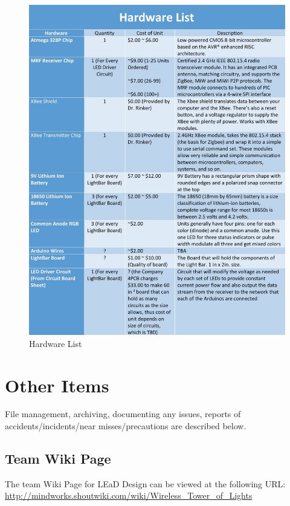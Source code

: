 \documentclass[12pt]{article}
\begin{document}
{{{{			\begin{figure}[ht!]
				\centering
				\includegraphics[width=170mm]{assets/HardwareList.jpg}
				\caption{Hardware List \label{overflow}}
			\end{figure}
			
			\newpage

\section{Other Items}
	File management, archiving, documenting any issues, reports of accidents/incidents/near misses/precautions are described below.
	
	\subsection{Team Wiki Page}
	The team Wiki Page for LEaD Design can be viewed at the following URL: \\
	\url{http://mindworks.shoutwiki.com/wiki/Wireless_Tower_of_Lights}
	
}}}}
\end{document}
